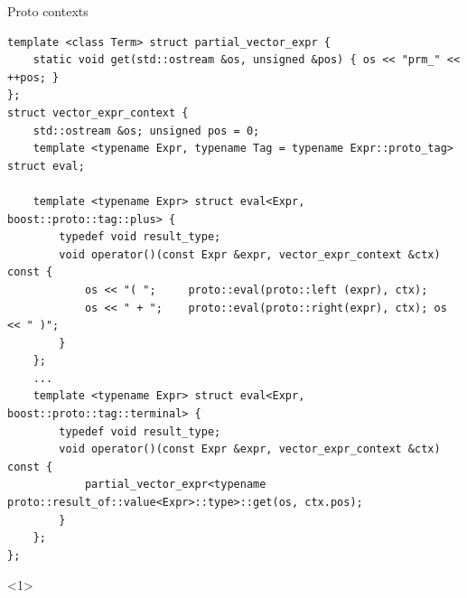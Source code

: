 \documentclass[@BEAMER_OPTIONS@]{beamer}
\begin{document}
\begin{frame}[fragile]
    \begin{exampleblock}{Proto contexts}
        \begin{adjustbox}{width=0.9\textwidth, height=\textheight, keepaspectratio}
            \begin{minipage}{\textwidth}
                \begin{lstlisting}
template <class Term> struct partial_vector_expr {
    static void get(std::ostream &os, unsigned &pos) { os << "prm_" << ++pos; }
};
struct vector_expr_context {
    std::ostream &os; unsigned pos = 0;
    template <typename Expr, typename Tag = typename Expr::proto_tag> struct eval;

    template <typename Expr> struct eval<Expr, boost::proto::tag::plus> {
        typedef void result_type;
        void operator()(const Expr &expr, vector_expr_context &ctx) const {
            os << "( ";     proto::eval(proto::left (expr), ctx);
            os << " + ";    proto::eval(proto::right(expr), ctx); os << " )";
        }
    };
    ...
    template <typename Expr> struct eval<Expr, boost::proto::tag::terminal> {
        typedef void result_type;
        void operator()(const Expr &expr, vector_expr_context &ctx) const {
            partial_vector_expr<typename proto::result_of::value<Expr>::type>::get(os, ctx.pos);
        }
    };
};
                \end{lstlisting}
            \end{minipage}
        \end{adjustbox}
    \end{exampleblock}
    \begin{onlyenv}<1>

\end{onlyenv}
\end{frame}
\end{document}
